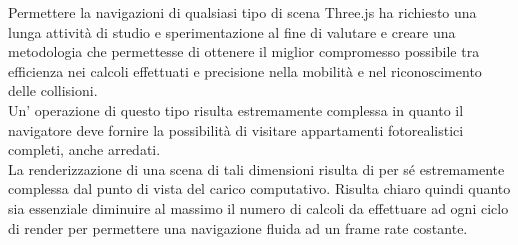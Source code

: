 Permettere la navigazioni di qualsiasi tipo di scena Three.js ha richiesto una lunga attività di studio e sperimentazione al fine di valutare e creare una metodologia che permettesse di ottenere il miglior compromesso possibile tra efficienza nei calcoli effettuati e precisione nella mobilità e nel riconoscimento delle collisioni. 
\\
Un’ operazione di questo tipo risulta estremamente complessa in quanto il navigatore deve fornire la possibilità di visitare appartamenti fotorealistici completi, anche arredati.
\\
La renderizzazione di una scena di tali dimensioni risulta di per sé estremamente complessa dal punto di vista del carico computativo. Risulta chiaro quindi quanto sia essenziale diminuire al massimo il numero di calcoli da effettuare ad ogni ciclo di render per permettere una navigazione fluida ad un frame rate costante. 




